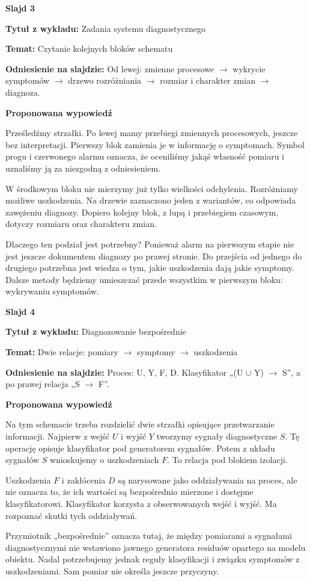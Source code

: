 \documentclass[a4paper,11pt]{article}
\newcommand{\NumerSlajdu}{1}
\newcommand{\Komentarz}[3]{%
  \gdef\NumerSlajdu{#1}%
  {\Large\bfseries Slajd #1\par}\smallskip
  \textbf{Tytuł z wykładu:} #2\par
  \textbf{Temat:} #3\par\medskip
}
\begin{document}
\Komentarz{3}{Zadania systemu diagnostycznego}{Czytanie kolejnych bloków schematu}
{\small\color{black!65}\textbf{Odniesienie na slajdzie:} Od lewej: zmienne procesowe \ensuremath{\to} wykrycie symptomów \ensuremath{\to} drzewo rozróżniania \ensuremath{\to} rozmiar i charakter zmian \ensuremath{\to} diagnoza.\par}
\medskip
\textbf{Proponowana wypowiedź}\par
Prześledźmy strzałki. Po lewej mamy przebiegi zmiennych procesowych, jeszcze bez interpretacji. Pierwszy blok zamienia je w informację o symptomach. Symbol progu i czerwonego alarmu oznacza, że oceniliśmy jakąś własność pomiaru i uznaliśmy ją za niezgodną z odniesieniem.

W środkowym bloku nie mierzymy już tylko wielkości odchylenia. Rozróżniamy możliwe uszkodzenia. Na drzewie zaznaczono jeden z wariantów, co odpowiada zawężeniu diagnozy. Dopiero kolejny blok, z lupą i przebiegiem czasowym, dotyczy rozmiaru oraz charakteru zmian.

Dlaczego ten podział jest potrzebny? Ponieważ alarm na pierwszym etapie nie jest jeszcze dokumentem diagnozy po prawej stronie. Do przejścia od jednego do drugiego potrzebna jest wiedza o tym, jakie uszkodzenia dają jakie symptomy. Dalsze metody będziemy umieszczać przede wszystkim w pierwszym bloku: wykrywaniu symptomów.
\clearpage

\Komentarz{4}{Diagnozowanie bezpośrednie}{Dwie relacje: pomiary \ensuremath{\to} symptomy \ensuremath{\to} uszkodzenia}
{\small\color{black!65}\textbf{Odniesienie na slajdzie:} Proces: U, Y, F, D. Klasyfikator „(U \ensuremath{\cup} Y) \ensuremath{\to} S”, a po prawej relacja „S \ensuremath{\to} F”.\par}
\medskip
\textbf{Proponowana wypowiedź}\par
Na tym schemacie trzeba rozdzielić dwie strzałki opisujące przetwarzanie informacji. Najpierw z wejść $U$ i wyjść $Y$ tworzymy sygnały diagnostyczne $S$. Tę operację opisuje klasyfikator pod generatorem sygnałów. Potem z układu sygnałów $S$ wnioskujemy o uszkodzeniach $F$. To relacja pod blokiem izolacji.

Uszkodzenia $F$ i zakłócenia $D$ są narysowane jako oddziaływania na proces, ale nie oznacza to, że ich wartości są bezpośrednio mierzone i dostępne klasyfikatorowi. Klasyfikator korzysta z obserwowanych wejść i wyjść. Ma rozpoznać skutki tych oddziaływań.

Przymiotnik „bezpośrednie” oznacza tutaj, że między pomiarami a sygnałami diagnostycznymi nie wstawiono jawnego generatora residuów opartego na modelu obiektu. Nadal potrzebujemy jednak reguły klasyfikacji i związku symptomów z uszkodzeniami. Sam pomiar nie określa jeszcze przyczyny.
\clearpage
\end{document}
